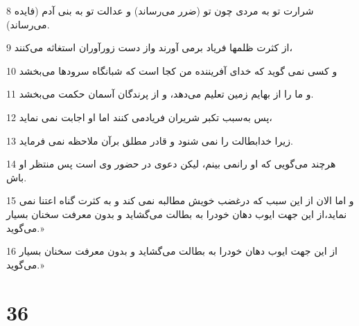 \par 8 شرارت تو به مردی چون تو (ضرر می‌رساند) و عدالت تو به بنی آدم (فایده می‌رساند).
\par 9 از کثرت ظلمها فریاد برمی آورند واز دست زورآوران استغاثه می‌کنند،
\par 10 و کسی نمی گوید که خدای آفریننده من کجا است که شبانگاه سرودها می‌بخشد
\par 11 و ما را از بهایم زمین تعلیم می‌دهد، و از پرندگان آسمان حکمت می‌بخشد.
\par 12 پس به‌سبب تکبر شریران فریادمی کنند اما او اجابت نمی نماید،
\par 13 زیرا خدابطالت را نمی شنود و قادر مطلق برآن ملاحظه نمی فرماید.
\par 14 هرچند می‌گویی که او رانمی بینم، لیکن دعوی در حضور وی است پس منتظر او باش.
\par 15 و اما الان از این سبب که درغضب خویش مطالبه نمی کند و به کثرت گناه اعتنا نمی نماید،از این جهت ایوب دهان خودرا به بطالت می‌گشاید و بدون معرفت سخنان بسیار می‌گوید.»
\par 16 از این جهت ایوب دهان خودرا به بطالت می‌گشاید و بدون معرفت سخنان بسیار می‌گوید.»
 
\chapter{36}

